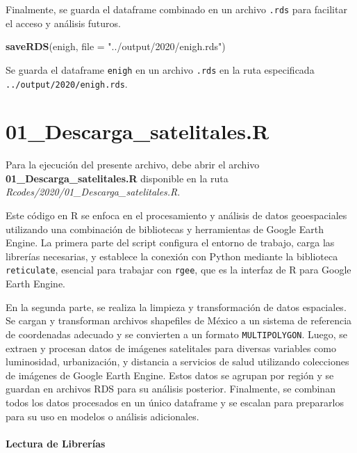 \documentclass[
  12pt,
]{book}
\newenvironment{Shaded}{\begin{snugshade}}{\end{snugshade}}
\newcommand{\AttributeTok}[1]{\textcolor[rgb]{0.13,0.29,0.53}{#1}}
\newcommand{\FunctionTok}[1]{\textcolor[rgb]{0.13,0.29,0.53}{\textbf{#1}}}
\newcommand{\NormalTok}[1]{#1}
\newcommand{\StringTok}[1]{\textcolor[rgb]{0.31,0.60,0.02}{#1}}
\begin{document}
Finalmente, se guarda el dataframe combinado en un archivo \texttt{.rds} para facilitar el acceso y análisis futuros.

\begin{Shaded}
\begin{Highlighting}[]
   \FunctionTok{saveRDS}\NormalTok{(enigh, }\AttributeTok{file =} \StringTok{"../output/2020/enigh.rds"}\NormalTok{)}
\end{Highlighting}
\end{Shaded}

Se guarda el dataframe \texttt{enigh} en un archivo \texttt{.rds} en la ruta especificada \texttt{../output/2020/enigh.rds}.

\hypertarget{descarga_satelitales.r}{%
\chapter*{01\_Descarga\_satelitales.R}\label{descarga_satelitales.r}}

Para la ejecución del presente archivo, debe abrir el archivo \textbf{01\_Descarga\_satelitales.R} disponible en la ruta \emph{Rcodes/2020/01\_Descarga\_satelitales.R}.

Este código en R se enfoca en el procesamiento y análisis de datos geoespaciales utilizando una combinación de bibliotecas y herramientas de Google Earth Engine. La primera parte del script configura el entorno de trabajo, carga las librerías necesarias, y establece la conexión con Python mediante la biblioteca \texttt{reticulate}, esencial para trabajar con \texttt{rgee}, que es la interfaz de R para Google Earth Engine.

En la segunda parte, se realiza la limpieza y transformación de datos espaciales. Se cargan y transforman archivos shapefiles de México a un sistema de referencia de coordenadas adecuado y se convierten a un formato \texttt{MULTIPOLYGON}. Luego, se extraen y procesan datos de imágenes satelitales para diversas variables como luminosidad, urbanización, y distancia a servicios de salud utilizando colecciones de imágenes de Google Earth Engine. Estos datos se agrupan por región y se guardan en archivos RDS para su análisis posterior. Finalmente, se combinan todos los datos procesados en un único dataframe y se escalan para prepararlos para su uso en modelos o análisis adicionales.

\hypertarget{lectura-de-libreruxedas}{%
\subsubsection*{Lectura de Librerías}\label{lectura-de-libreruxedas}}
\end{document}
